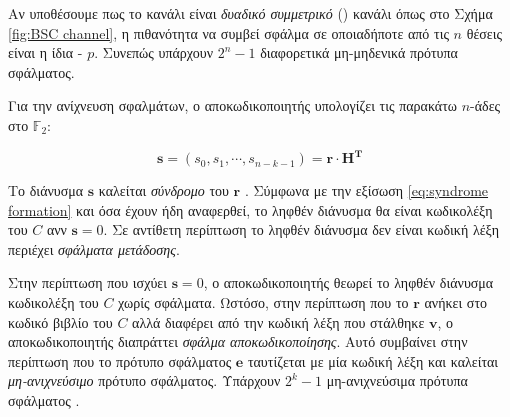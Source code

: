 Αν υποθέσουμε πως το κανάλι είναι \textit{δυαδικό συμμετρικό} () κανάλι όπως στο Σχήμα \ref{fig:BSC channel}, η πιθανότητα να συμβεί σφάλμα σε οποιαδήποτε από τις $n$ θέσεις είναι η ίδια - $p$. Συνεπώς υπάρχουν $2^n-1$ διαφορετικά μη-μηδενικά πρότυπα σφάλματος. 

Για την ανίχνευση σφαλμάτων, ο αποκωδικοποιητής υπολογίζει τις παρακάτω $n$-άδες στο $\mathbb{F}_2$:

\begin{equation}
\mathbf{s} = \left(s_0, s_1, \cdots, s_{n-k-1}\right) = \mathbf{r}\cdot\mathbf{H^T}
\label{eq:syndrome formation}
\end{equation}

Το διάνυσμα $\mathbf{s}$ καλείται \textit{σύνδρομο} του $\mathbf{r}$ \cite{ryan2009channel}. Σύμφωνα με την εξίσωση \ref{eq:syndrome formation} και όσα έχουν ήδη αναφερθεί, το ληφθέν διάνυσμα θα είναι κωδικολέξη του $C$ ανν $\mathbf{s}=0$. Σε αντίθετη περίπτωση το ληφθέν διάνυσμα δεν είναι κωδική λέξη περιέχει \textit{σφάλματα μετάδοσης}.

Στην περίπτωση που ισχύει $\mathbf{s}=0$, ο αποκωδικοποιητής θεωρεί το ληφθέν διάνυσμα κωδικολέξη του $C$ χωρίς σφάλματα. Ωστόσο, στην περίπτωση που το $\mathbf{r}$ ανήκει στο κωδικό βιβλίο του $C$ αλλά διαφέρει από την κωδική λέξη που στάλθηκε $\mathbf{v}$, ο αποκωδικοποιητής διαπράττει \textit{σφάλμα αποκωδικοποίησης}. Αυτό συμβαίνει στην περίπτωση που το πρότυπο σφάλματος $\mathbf{e}$ ταυτίζεται με μία κωδική λέξη και καλείται \textit{μη-ανιχνεύσιμο} πρότυπο σφάλματος. Υπάρχουν $2^k-1$ μη-ανιχνεύσιμα πρότυπα σφάλματος \cite{macwilliams1977theory}.


